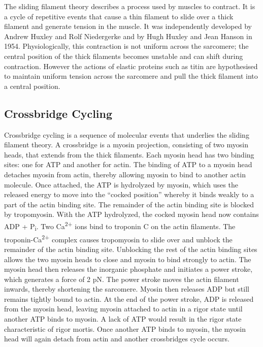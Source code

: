The sliding filament theory describes a process used by muscles to contract. It is a cycle of repetitive events that cause a thin filament to slide over a thick filament and generate tension in the muscle. It was independently developed by Andrew Huxley and Rolf Niedergerke and by Hugh Huxley and Jean Hanson in 1954. Physiologically, this contraction is not uniform across the sarcomere; the central position of the thick filaments becomes unstable and can shift during contraction. However the actions of elastic proteins such as titin are hypothesised to maintain uniform tension across the sarcomere and pull the thick filament into a central position.

\hypertarget{crossbridge-cycling}{%
\subsection{Crossbridge Cycling}\label{crossbridge-cycling}}

Crossbridge cycling is a sequence of molecular events that underlies the sliding filament theory. A crossbridge is a myosin projection, consisting of two myosin heads, that extends from the thick filaments. Each myosin head has two binding sites: one for ATP and another for actin. The binding of ATP to a myosin head detaches myosin from actin, thereby allowing myosin to bind to another actin molecule. Once attached, the ATP is hydrolyzed by myosin, which uses the released energy to move into the ``cocked position'' whereby it binds weakly to a part of the actin binding site. The remainder of the actin binding site is blocked by tropomyosin. With the ATP hydrolyzed, the cocked myosin head now contains ADP + P\textsubscript{i}. Two Ca\textsuperscript{2+}
ions bind to troponin C on the actin filaments. The troponin-Ca\textsuperscript{2+} complex causes tropomyosin to slide over and unblock the remainder of the actin binding site. Unblocking the rest of the actin binding sites allows the two myosin heads to close and myosin to bind strongly to actin. The myosin head then releases the inorganic phosphate and initiates a power stroke, which generates a force of 2 pN. The power stroke moves the actin filament inwards, thereby shortening the sarcomere. Myosin then releases ADP but still remains tightly bound to actin. At the end of the power stroke, ADP is released from the myosin head, leaving myosin attached to actin in a rigor state until another ATP binds to myosin. A lack of ATP would result in the rigor state characteristic of rigor mortis. Once another ATP binds to myosin, the myosin head will again detach from actin and another crossbridges cycle occurs.



